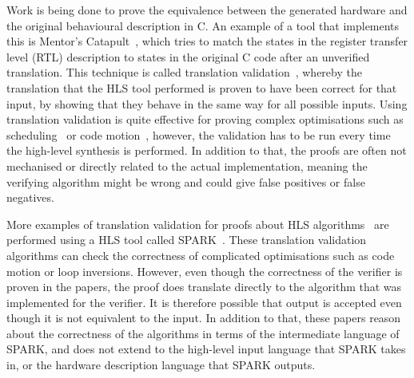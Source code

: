 Work is being done to prove the equivalence between the generated hardware and the original
behavioural description in C.  An example of a tool that implements this is Mentor's
Catapult~\cite{mentor20_catap_high_level_synth}, which tries to match the states in the register
transfer level (RTL) description to states in the original C code after an unverified translation.
This technique is called translation validation~\cite{pnueli98_trans}, whereby the translation that
the HLS tool performed is proven to have been correct for that input, by showing that they behave in
the same way for all possible inputs.  Using translation validation is quite effective for proving
complex optimisations such as
scheduling~\cite{kim04_autom_fsmd,karfa06_formal_verif_method_sched_high_synth,chouksey20_verif_sched_condit_behav_high_level_synth}
or code
motion~\cite{banerjee14_verif_code_motion_techn_using_value_propag,chouksey19_trans_valid_code_motion_trans_invol_loops},
however, the validation has to be run every time the high-level synthesis is performed.  In addition
to that, the proofs are often not mechanised or directly related to the actual implementation,
meaning the verifying algorithm might be wrong and could give false positives or false negatives.

More examples of translation validation for proofs about HLS
algorithms~\cite{karfa06_formal_verif_method_sched_high_synth,karfa07_hand_verif_high_synth,kundu07_autom,karfa08_equiv_check_method_sched_verif,kundu08_valid_high_level_synth,karfa10_verif_datap_contr_gener_phase,karfa12_formal_verif_code_motion_techn,chouksey19_trans_valid_code_motion_trans_invol_loops,chouksey20_verif_sched_condit_behav_high_level_synth}
are performed using a HLS tool called SPARK~\cite{gupta03_spark}.  These translation validation
algorithms can check the correctness of complicated optimisations such as code motion or loop
inversions.  However, even though the correctness of the verifier is proven in the papers, the proof
does translate directly to the algorithm that was implemented for the verifier.  It is therefore
possible that output is accepted even though it is not equivalent to the input.  In addition to
that, these papers reason about the correctness of the algorithms in terms of the intermediate
language of SPARK, and does not extend to the high-level input language that SPARK takes in, or the
hardware description language that SPARK outputs.


